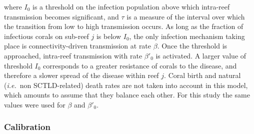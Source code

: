 \documentclass[utf8]{frontiersSCNS}
\newcommand{\ie}{{\it i.e.}\ }
\begin{document}
where $I_0$ is a threshold on the infection population above which intra-reef transmission becomes significant, and $\tau$ is a measure of the interval over which the transition from low to high transmission occurs. As long as the fraction of infectious corals on sub-reef $j$ is below $I_0$, the only infection mechanism taking place is connectivity-driven transmission at rate $\beta$. Once the threshold is approached, intra-reef transmission with rate $\beta'_0$ is activated. A larger value of threshold $I_0$ corresponds to a greater resistance of corals to the disease, and therefore a slower spread of the disease within reef $j$. Coral birth and natural (\ie non SCTLD-related) death rates are not taken into account in this model, which amounts to assume that they balance each other. For this study the same values were used for $\beta$ and $\beta'_0$.

\subsubsection{Calibration}
\end{document}
